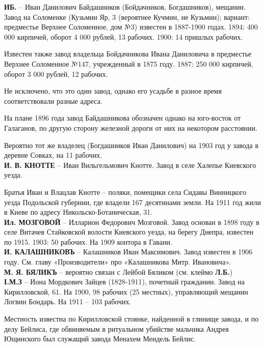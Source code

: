 \noindent\textbf{ИБ.} – Иван Данилович Байдашников (Бойдачников, Бог\-дашников), мещанин. Завод на Соломенке (Кузьмин Яр, 3 (вероятнее Кучмин, не Кузьмин); вариант: предместье Верхнее Соломенное, дом №3) известен в 1887-1900 годах. 1894: 400 000 кирпичей, оборот 4 000 рублей, 13 рабочих. 1900: 14 пришлых рабочих.

Известен также завод владельца {Бойдачникова Ивана Даниловича} в предместье Верхнее Соломенное №147, учрежденный в 1875 году. 1887: 250 000 кирпичей, оборот 3 000 рублей, 12 рабочих.

Не исключено, что это один завод, однако его усадьбе в разное время соответствовали разные адреса.

На плане 1896 года завод Байдашникова обозначен однако на юго-восток от Галаганов, по другую сторону железной дороги от них на некотором расстоянии.

Вероятно тот же владелец (Богдашников Иван Данилович) на 1903 год у завода в деревне Совках, на 11 рабочих.\\

\noindent\textbf{И. В. КНОТТЕ} – Иван Вильгельмович Кнотте. Завод в селе Халепье Киевского уезда.

Братья Иван и Влацлав Кнотте – поляки, помещики села Сидавы Винницкого уезда Подольской губернии, где владели 167 десятинами земли. На 1911 год жили в Киеве по адресу Никольско-Ботаническая, 31.\\

\noindent\textbf{Ил. МОЗГОВОЙ} – Илларион Федорович Мозговой. Завод основан в 1898 году в селе Витачев Стайковской волости Киевского уезда, на берегу Днепра, известен по 1915. 1903: 50 рабочих. На 1909 контора в Гавани.\\ 

\noindent\textbf{И. КАЛАШНИКОВЪ} – Калашников Иван Максимович. Завод известен в 1906 году. См. главу «Производители» про «Калашникова Митр. Ивановича».\\

\noindent\textbf{М. Я. БЯЛИКЪ} – вероятно связан с Лейбой Бяликом (см. клеймо \textbf{Л.Б.})\\

\noindent\textbf{І.М.З} – Иона Мордкович Зайцев (1828-1911), почетный гражданин. Завод на Кирилловской, 61. На 1900, 98 рабочих (25 местных), управляющий мещанин Логвин Бондарь. На 1911 – 103 рабочих. 

Местность известна по Кирилловской стоянке, найденной в глинище завода, и по делу Бейлиса, где обвиняемым в ритуальном убийстве мальчика Андрея Ющинского был служащий завода Менахем Мендель Бейлис. 

